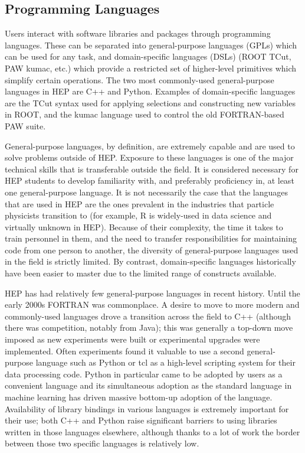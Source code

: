 \subsection{Programming Languages}
Users interact with software libraries and packages through programming languages. These can be separated into general-purpose languages (GPLs) which can be used for any task, and domain-specific languages (DSLs) (ROOT TCut, PAW kumac, etc.) which provide a restricted set of higher-level primitives which simplify certain operations. The two most commonly-used general-purpose languages in HEP are C++ and Python. Examples of domain-specific languages are the TCut syntax used for applying selections and constructing new variables in ROOT, and the kumac language used to control the old FORTRAN-based PAW suite.

General-purpose languages, by definition, are extremely capable and are used to solve problems outside of HEP. Exposure to these languages is one of the major technical skills that is transferable outside the field. It is considered necessary for HEP students to develop familiarity with, and preferably proficiency in, at least one general-purpose language. It is not necessarily the case that the languages that are used in HEP are the ones prevalent in the industries that particle physicists transition to (for example, R is widely-used in data science and virtually unknown in HEP). Because of their complexity, the time it takes to train personnel in them, and the need to transfer responsibilities for maintaining code from one person to another, the diversity of general-purpose languages used in the field is strictly limited. By contrast, domain-specific languages historically have been easier to master due to the limited range of constructs available.

HEP has had relatively few general-purpose languages in recent history. Until the early 2000s FORTRAN was commonplace. A desire to move to more modern and commonly-used languages drove a transition across the field to C++ (although there was competition, notably from Java); this was generally a top-down move imposed as new experiments were built or experimental upgrades were implemented. Often experiments found it valuable to use a second general-purpose language such as Python or tcl as a high-level scripting system for their data processing code. Python in particular came to be adopted by users as a convenient language and its simultaneous adoption as the standard language in machine learning has driven massive bottom-up adoption of the language. Availability of library bindings in various languages is extremely important for their use; both C++ and Python raise significant barriers to using libraries written in those languages elsewhere, although thanks to a lot of work the border between those two specific languages is relatively low.

